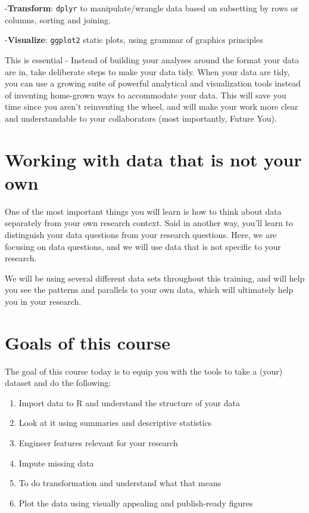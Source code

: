 \documentclass[
]{book}
\providecommand{\tightlist}{%
  \setlength{\itemsep}{0pt}\setlength{\parskip}{0pt}}
\begin{document}
-\textbf{Transform}: \texttt{dplyr} to manipulate/wrangle data based on
subsetting by rows or columns, sorting and joining.

-\textbf{Visualize}: \texttt{ggplot2} static plots, using grammar of
graphics principles

This is essential - Instead of building your analyses around the format
your data are in, take deliberate steps to make your data tidy. When
your data are tidy, you can use a growing suite of powerful analytical
and visualization tools instead of inventing home-grown ways to
accommodate your data. This will save you time since you aren't
reinventing the wheel, and will make your work more clear and
understandable to your collaborators (most importantly, Future You).

\hypertarget{working-with-data-that-is-not-your-own}{%
\section{Working with data that is not your
own}\label{working-with-data-that-is-not-your-own}}

One of the most important things you will learn is how to think about
data separately from your own research context. Said in another way,
you'll learn to distinguish your data questions from your research
questions. Here, we are focusing on data questions, and we will use data
that is not specific to your research.

We will be using several different data sets throughout this training,
and will help you see the patterns and parallels to your own data, which
will ultimately help you in your research.

\hypertarget{goals-of-this-course}{%
\section{Goals of this course}\label{goals-of-this-course}}

The goal of this course today is to equip you with the tools to take a
(your) dataset and do the following:

\begin{enumerate}
\def\labelenumi{\arabic{enumi}.}
\tightlist
\item
  Import data to R and understand the structure of your data
\item
  Look at it using summaries and descriptive statistics
\item
  Engineer features relevant for your research
\item
  Impute missing data
\item
  To do transformation and understand what that means
\item
  Plot the data using visually appealing and publish-ready figures
\end{enumerate}
\end{document}
